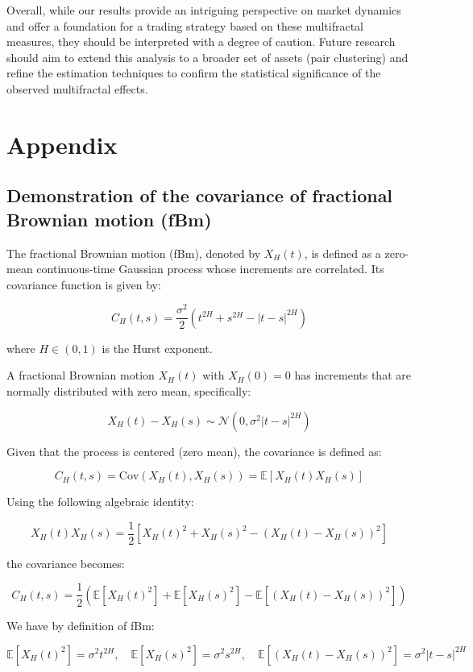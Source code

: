 \documentclass[11pt]{extarticle}
\begin{document}
Overall, while our results provide an intriguing perspective on market dynamics and offer a foundation for a trading
strategy based on these multifractal measures, they should be interpreted with a degree of caution. Future research
should aim to extend this analysis to a broader set of assets (pair clustering) and refine the estimation techniques
to confirm the statistical significance of the observed multifractal effects.

\section{Appendix}

\subsection{Demonstration of the covariance of fractional Brownian motion (fBm)}
\label{sec:covariance_fbm}

The fractional Brownian motion (fBm), denoted by \( X_H(t) \), is defined as a zero-mean continuous-time Gaussian process whose increments are correlated. Its covariance function is given by:

\[
C_H(t,s) = \frac{\sigma^2}{2}\left(t^{2H}+s^{2H}-|t-s|^{2H}\right)
\]

where \( H \in (0,1) \) is the Hurst exponent.

A fractional Brownian motion \( X_H(t) \) with \( X_H(0)=0 \) has increments that are normally distributed with zero mean, specifically:

\[
X_H(t)-X_H(s) \sim \mathcal{N}(0,\sigma^2|t-s|^{2H})
\]

Given that the process is centered (zero mean), the covariance is defined as:

\[
C_H(t,s) = \text{Cov}(X_H(t), X_H(s)) = \mathbb{E}[X_H(t)X_H(s)]
\]

Using the following algebraic identity:

\[
X_H(t)X_H(s) = \frac{1}{2}\left[X_H(t)^2 + X_H(s)^2 - (X_H(t)-X_H(s))^2\right]
\]

the covariance becomes:

\[
C_H(t,s) = \frac{1}{2}\left(\mathbb{E}[X_H(t)^2]+\mathbb{E}[X_H(s)^2]-\mathbb{E}[(X_H(t)-X_H(s))^2]\right)
\]


We have by definition of fBm:

\[
\mathbb{E}[X_H(t)^2] = \sigma^2 t^{2H}, \quad \mathbb{E}[X_H(s)^2] = \sigma^2 s^{2H}, \quad \mathbb{E}[(X_H(t)-X_H(s))^2] = \sigma^2 |t-s|^{2H}
\]
\end{document}
